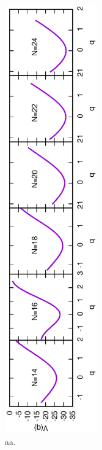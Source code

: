 \documentclass[%
superscriptaddress,
showpacs,
nofootinbib,
amsmath,amssymb,
aps,
prc,
twocolumn,
floatfix ]%
{revtex4-1}
\begin{document}
\begin{figure}[t]
 \begin{center}
  \includegraphics[width=40mm,angle=-90]{potential.eps}
 \end{center}
 \captionsetup{labelformat=empty,labelsep=none}
	\caption{aa.
}
 \label{fig:N8Pad}
\end{figure}
\end{document}
